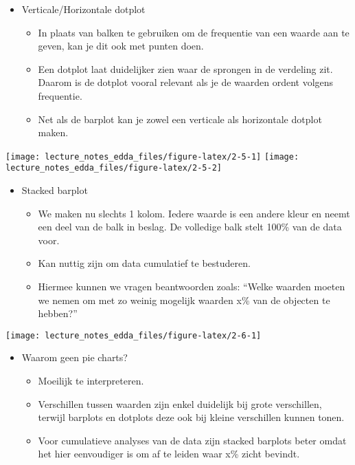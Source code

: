 \documentclass[]{memoir}
\providecommand{\tightlist}{%
  \setlength{\itemsep}{0pt}\setlength{\parskip}{0pt}}
\begin{document}
\begin{itemize}
\tightlist
\item
  Verticale/Horizontale dotplot

  \begin{itemize}
  \tightlist
  \item
    In plaats van balken te gebruiken om de frequentie van een waarde
    aan te geven, kan je dit ook met punten doen.
  \item
    Een dotplot laat duidelijker zien waar de sprongen in de verdeling
    zit. Daarom is de dotplot vooral relevant als je de waarden ordent
    volgens frequentie.
  \item
    Net als de barplot kan je zowel een verticale als horizontale
    dotplot maken.
  \end{itemize}
\end{itemize}

\texttt{[image: lecture\_notes\_edda\_files/figure-latex/2-5-1]}
\texttt{[image: lecture\_notes\_edda\_files/figure-latex/2-5-2]}

\begin{itemize}
\tightlist
\item
  Stacked barplot

  \begin{itemize}
  \tightlist
  \item
    We maken nu slechts 1 kolom. Iedere waarde is een andere kleur en
    neemt een deel van de balk in beslag. De volledige balk stelt 100\%
    van de data voor.
  \item
    Kan nuttig zijn om data cumulatief te bestuderen.
  \item
    Hiermee kunnen we vragen beantwoorden zoals: ``Welke waarden moeten
    we nemen om met zo weinig mogelijk waarden x\% van de objecten te
    hebben?''
  \end{itemize}
\end{itemize}

\texttt{[image: lecture\_notes\_edda\_files/figure-latex/2-6-1]}

\begin{itemize}
\tightlist
\item
  Waarom geen pie charts?

  \begin{itemize}
  \tightlist
  \item
    Moeilijk te interpreteren.
  \item
    Verschillen tussen waarden zijn enkel duidelijk bij grote
    verschillen, terwijl barplots en dotplots deze ook bij kleine
    verschillen kunnen tonen.
  \item
    Voor cumulatieve analyses van de data zijn stacked barplots beter
    omdat het hier eenvoudiger is om af te leiden waar x\% zicht
    bevindt.
  \end{itemize}
\end{itemize}
\end{document}
